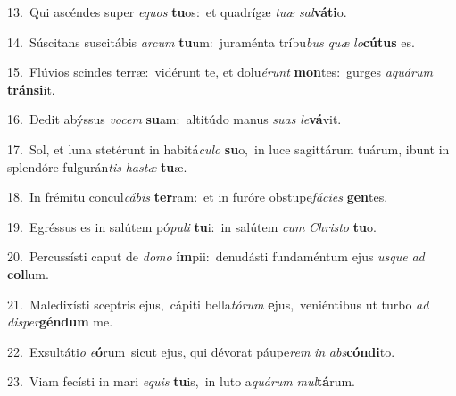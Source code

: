 {\numbfont\textcolor{\numbcolor}{13.}}~Qui ascéndes super \textit{e}\-\textit{quos} \textbf{tu}\-os:~\star et quadrígæ \textit{tu}\-\textit{æ} \textit{sal}\-\textbf{vá}\textbf{ti}o.\par
{\numbfont\textcolor{\numbcolor}{14.}}~Súscitans suscitábis \textit{ar}\-\textit{cum} \textbf{tu}\-um:~\star juraménta tríbu\textit{bus} \textit{quæ} \textit{lo}\-\textbf{cú}\textbf{tus} es.\par
{\numbfont\textcolor{\numbcolor}{15.}}~Flúvios scindes terræ:~\dagger vidérunt te, et dolu\-\textit{é}\-\textit{runt} \textbf{mon}\-tes:~\star gurges \textit{a}\-\textit{quá}\textit{rum} \textbf{tráns}\-\textbf{i}it.\par
{\numbfont\textcolor{\numbcolor}{16.}}~Dedit abýssus \textit{vo}\-\textit{cem} \textbf{su}\-am:~\star altitúdo manus \textit{su}\-\textit{as} \textit{le}\-\textbf{vá}vit.\par
{\numbfont\textcolor{\numbcolor}{17.}}~Sol, et luna stetérunt in habitá\-\textit{cu}\-\textit{lo} \textbf{su}\-o,~\star in luce sagittárum tuárum, ibunt in splendóre fulgurán\textit{tis} \textit{has}\-\textit{tæ} \textbf{tu}\-æ.\par
{\numbfont\textcolor{\numbcolor}{18.}}~In frémitu concul\-\textit{cá}\-\textit{bis} \textbf{ter}\-ram:~\star et in furóre obstupe\-\textit{fá}\-\textit{ci}\textit{es} \textbf{gen}\-tes.\par
{\numbfont\textcolor{\numbcolor}{19.}}~Egréssus es in salútem pó\-\textit{pu}\-\textit{li} \textbf{tu}\-i:~\star in salútem \textit{cum} \textit{Chris}\-\textit{to} \textbf{tu}\-o.\par
{\numbfont\textcolor{\numbcolor}{20.}}~Percussísti caput de \textit{do}\-\textit{mo} \textbf{ím}\-pii:~\star denudásti fundaméntum ejus \textit{us}\-\textit{que} \textit{ad} \textbf{col}\-lum.\par
{\numbfont\textcolor{\numbcolor}{21.}}~Maledixísti sceptris ejus,~\dagger cápiti bella\-\textit{tó}\-\textit{rum} \textbf{e}\-jus,~\star veniéntibus ut turbo \textit{ad} \textit{di}\-\textit{sper}\textbf{gén}\textbf{dum} me.\par
{\numbfont\textcolor{\numbcolor}{22.}}~Exsultáti\textit{o} \textit{e}\-\textbf{ó}rum~\star sicut ejus, qui dévorat páupe\textit{rem} \textit{in} \textit{abs}\-\textbf{cón}\textbf{di}to.\par
{\numbfont\textcolor{\numbcolor}{23.}}~Viam fecísti in mari \textit{e}\-\textit{quis} \textbf{tu}\-is,~\star in luto a\-\textit{quá}\-\textit{rum} \textit{mul}\-\textbf{tá}rum.\par
